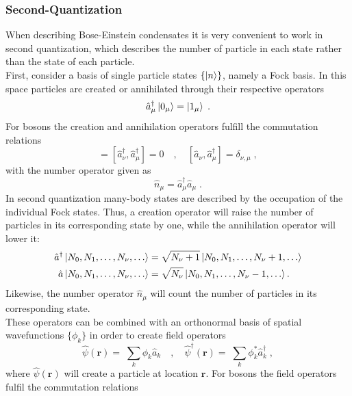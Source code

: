 \subsubsection{Second-Quantization}
When describing Bose-Einstein condensates it is very convenient to work in second quantization, which describes the number of particle in each state rather than the state of each particle.\\
First, consider a basis of single particle states $\{ \ket{n} \}$, namely a Fock basis. In this space particles are created or annihilated through their respective operators
\begin{equation}
	\hat{a}_{\mu}^{\dag} \ket{0_\mu} = \ket{1_\mu} \; .
\end{equation}
For bosons the creation and annihilation operators fulfill the commutation relations
\begin{equation}
[\hat{a}_\nu,\hat{a}_\mu]=[\hat{a}_\nu^\dagger,\hat{a}_\mu^\dagger]=0 \quad , \quad [\hat{a}_\nu,\hat{a}_\mu^\dagger]=\delta_{\nu,\mu} \; , 
\end{equation}
with the number operator given as
\begin{equation}
	\hat{n}_{\mu} = \hat{a}_{\mu}^{\dag} \hat{a}_{\mu} \; .
\end{equation}
In second quantization many-body states are described by the occupation of the individual Fock states. Thus, a creation operator will raise the number of particles in its corresponding state by one, while the annihilation operator will lower it:
\begin{align}
\hat{a}^\dagger \ket{N_0,N_1, \ldots , N_{\nu},\ldots}&= \sqrt{N_\nu+1}\ket{N_0,N_1, \ldots , N_{\nu}+1,\ldots} \\
\hat{a} \ket{N_0,N_1, \ldots , N_{\nu},\ldots}&= \sqrt{N_\nu}\ket{N_0,N_1, \ldots , N_{\nu}-1,\ldots} .
\end{align}
Likewise, the number operator $\hat{n}_{\mu}$ will count the number of particles in its corresponding state.\\
These operators can be combined with an orthonormal basis of spatial wavefunctions $\{ \phi_k \}$ in order to create field operators
\begin{equation}
	\hat{\psi}(\boldsymbol{r}) = \; \sum_{k} \phi_k \hat{a}_{k} \quad , \quad \hat{\psi}^{\dag}(\boldsymbol{r}) = \; \sum_{k} \phi_{k}^{*} \hat{a}_{k}^{\dag} \; ,
\end{equation}
where $\hat{\psi}(\boldsymbol{r})$ will create a particle at location $\boldsymbol{r}$. For bosons the field operators fulfil the commutation relations \cite{bruus}
